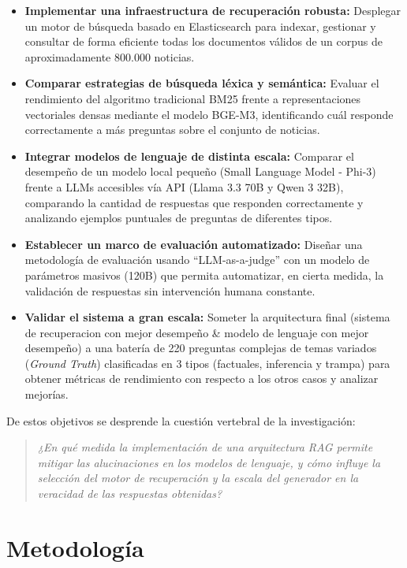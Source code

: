 \begin{itemize}
    \item \textbf{Implementar una infraestructura de recuperación robusta:} Desplegar un motor de búsqueda basado en Elasticsearch para indexar, gestionar y consultar de forma eficiente todas los documentos válidos de un corpus de aproximadamente 800.000 noticias.
    \item \textbf{Comparar estrategias de búsqueda léxica y semántica:} Evaluar el rendimiento del algoritmo tradicional BM25 frente a representaciones vectoriales densas mediante el modelo BGE-M3, identificando cuál responde correctamente a más preguntas sobre el conjunto de noticias.
    \item \textbf{Integrar modelos de lenguaje de distinta escala:} Comparar el desempeño de un modelo local pequeño (Small Language Model - Phi-3) frente a LLMs accesibles vía API (Llama 3.3 70B y Qwen 3 32B), comparando la cantidad de respuestas que responden correctamente y analizando ejemplos puntuales de preguntas de diferentes tipos.
    \item \textbf{Establecer un marco de evaluación automatizado:} Diseñar una metodología de evaluación usando ``LLM-as-a-judge'' con un modelo de parámetros masivos (120B) que permita automatizar, en cierta medida, la validación de respuestas sin intervención humana constante.
    \item \textbf{Validar el sistema a gran escala:} Someter la arquitectura final (sistema de recuperacion con mejor desempeño \& modelo de lenguaje con mejor desempeño) a una batería de 220 preguntas complejas de temas variados (\textit{Ground Truth}) clasificadas en 3 tipos (factuales, inferencia y trampa) para obtener métricas de rendimiento con respecto a los otros casos y analizar mejorías.
\end{itemize}

De estos objetivos se desprende la cuestión vertebral de la investigación:

\begin{quote}
    \textit{¿En qué medida la implementación de una arquitectura RAG permite mitigar las alucinaciones en los modelos de lenguaje, y cómo influye la selección del motor de recuperación y la escala del generador en la veracidad de las respuestas obtenidas?}
\end{quote}

\section{Metodología}

